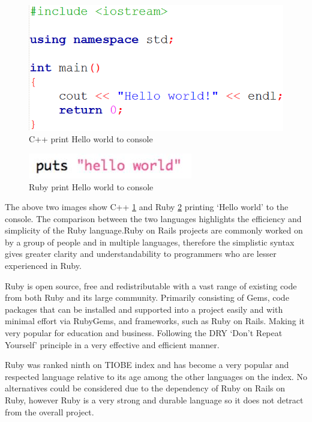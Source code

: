 \documentclass[a4paper,12pt]{article}
\begin{document}
\vspace{5mm}
\begin{figure}
\includegraphics[width=\linewidth]{screenshots/c++_hello_world}
\caption{C++ print Hello world to console}
\label{fig:c++print}
\end{figure}
\begin{figure}
\includegraphics[width=\linewidth]{screenshots/ruby_hello_world}
\caption{Ruby print Hello world to console}
\label{fig:rubyprint}
\end{figure}
\par The above two images show C++ \ref{fig:c++print} and Ruby \ref{fig:rubyprint} printing ‘Hello world’ to the console. The comparison between the two languages highlights the efficiency and simplicity of the Ruby language.Ruby on Rails projects are commonly worked on by a group of people and in multiple languages, therefore the simplistic syntax gives greater clarity and understandability to programmers who are lesser experienced in Ruby.\cite{AboutRuby}
\par Ruby is open source, free and redistributable with a vast range of existing code from both Ruby and its large community. Primarily consisting of Gems, code packages that can be installed and supported into a project easily and with minimal effort via RubyGems, and frameworks, such as Ruby on Rails. Making it very popular for education and business. Following the DRY ‘Don't Repeat Yourself’ principle in a very effective and efficient manner.\cite{AboutRuby}
\par Ruby was ranked ninth on TIOBE index\cite{TOBIE} and has become a very popular and respected language relative to its age among the other languages on the index. No alternatives could be considered due to the dependency of Ruby on Rails on Ruby, however Ruby is a very strong and durable language so it does not detract from the overall project.
\end{document}
